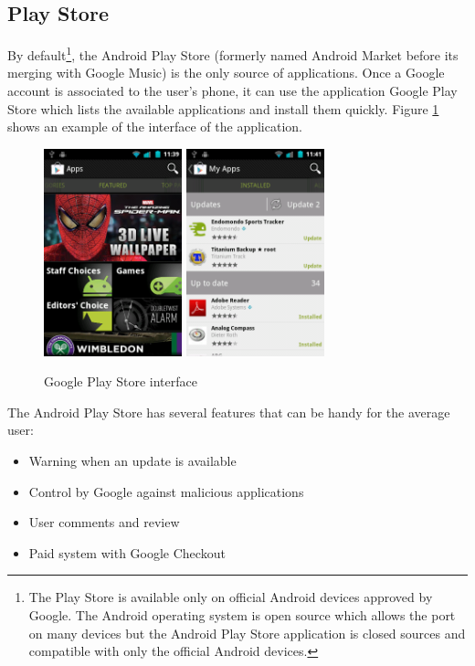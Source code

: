 \subsection{Play Store}
By default\footnote{The Play Store is available only on official Android devices approved by Google. The Android operating system is open source which allows the port on many devices but the Android Play Store application is closed sources and compatible with only the official Android devices.}, the Android Play Store (formerly named Android Market before its merging with Google Music) is the only source of applications.
Once a Google account is associated to the user's phone, it can use the application Google Play Store which lists the available applications and install them quickly.
Figure \ref{fig:market} shows an example of the interface of the application.\\

\begin{figure}[h]
  \centering
  \includegraphics[width=4cm]{images/market1.png}
  \includegraphics[width=4cm]{images/market2.png}
  \caption{Google Play Store interface}
  \label{fig:market}
\end{figure}

The Android Play Store has several features that can be handy for the average user:
\begin{itemize}
\item Warning when an update is available
\item Control by Google against malicious applications
\item User comments and review
\item Paid system with Google Checkout
\end{itemize}


